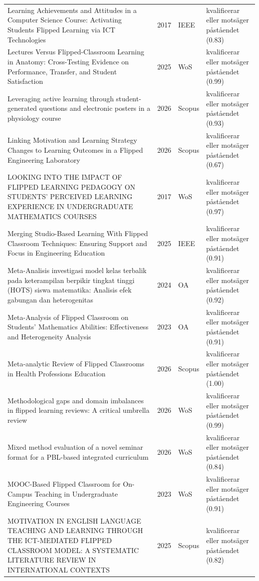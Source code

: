 \begin{longtable}{@{}%
  >{\raggedright\arraybackslash}p{}c%
  >{\raggedright\arraybackslash}p{}%
  >{\raggedright\arraybackslash}p{}@{}}
Learning Achievements and Attitudes in a Computer Science Course: Activating Students Flipped Learning via ICT Technologies & 2017 & IEEE & kvalificerar eller motsäger påståendet (0.83) \\
Lectures Versus Flipped-Classroom Learning in Anatomy: Cross-Testing Evidence on Performance, Transfer, and Student Satisfaction & 2025 & WoS & kvalificerar eller motsäger påståendet (0.99) \\
Leveraging active learning through student-generated questions and electronic posters in a physiology course & 2026 & Scopus & kvalificerar eller motsäger påståendet (0.93) \\
Linking Motivation and Learning Strategy Changes to Learning Outcomes in a Flipped Engineering Laboratory & 2026 & Scopus & kvalificerar eller motsäger påståendet (0.67) \\
LOOKING INTO THE IMPACT OF FLIPPED LEARNING PEDAGOGY ON STUDENTS' PERCEIVED LEARNING EXPERIENCE IN UNDERGRADUATE MATHEMATICS COURSES & 2017 & WoS & kvalificerar eller motsäger påståendet (0.97) \\
Merging Studio-Based Learning With Flipped Classroom Techniques: Ensuring Support and Focus in Engineering Education & 2025 & IEEE & kvalificerar eller motsäger påståendet (0.91) \\
Meta-Analisis investigasi model kelas terbalik pada keterampilan berpikir tingkat tinggi (HOTS) siswa matematika: Analisis efek gabungan dan heterogenitas & 2024 & OA & kvalificerar eller motsäger påståendet (0.92) \\
Meta-Analysis of Flipped Classroom on Students' Mathematics Abilities: Effectiveness and Heterogeneity Analysis & 2023 & OA & kvalificerar eller motsäger påståendet (0.91) \\
Meta-analytic Review of Flipped Classrooms in Health Professions Education & 2026 & Scopus & kvalificerar eller motsäger påståendet (1.00) \\
Methodological gaps and domain imbalances in flipped learning reviews: A critical umbrella review & 2026 & WoS & kvalificerar eller motsäger påståendet (0.99) \\
Mixed method evaluation of a novel seminar format for a PBL-based integrated curriculum & 2026 & WoS & kvalificerar eller motsäger påståendet (0.84) \\
MOOC-Based Flipped Classroom for On-Campus Teaching in Undergraduate Engineering Courses & 2023 & WoS & kvalificerar eller motsäger påståendet (0.91) \\
MOTIVATION IN ENGLISH LANGUAGE TEACHING AND LEARNING THROUGH THE ICT-MEDIATED FLIPPED CLASSROOM MODEL: A SYSTEMATIC LITERATURE REVIEW IN INTERNATIONAL CONTEXTS & 2025 & Scopus & kvalificerar eller motsäger påståendet (0.82) \\

\end{longtable}
